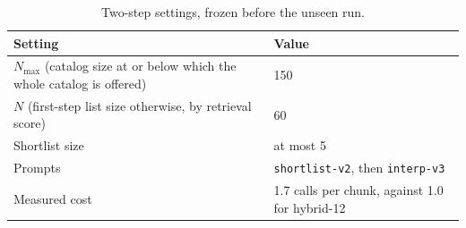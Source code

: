 \begin{table}[H]
\centering
\caption{Two-step settings, frozen before the unseen run.}
\label{tab:twostep-settings}
\begin{tabular}{p{}p{}}
\toprule
Setting & Value\\\midrule
$N_{\max}$ (catalog size at or below which the whole catalog is offered) & 150\\
$N$ (first-step list size otherwise, by retrieval score) & 60\\
Shortlist size & at most 5\\
Prompts & \texttt{shortlist-v2}, then \texttt{interp-v3}\\
Measured cost & 1.7 calls per chunk, against 1.0 for hybrid-12\\
\bottomrule
\end{tabular}
\end{table}
